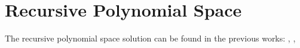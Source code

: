 \chapter{Recursive Polynomial Space}

The recursive polynomial space solution can be found in the previous works:  \cite{kavvadias1999evaluation}, \cite{kavvadias2005efficient}, 